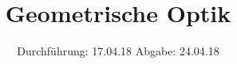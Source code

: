 

\subject{V408}
\title{Geometrische Optik}
\date{
  Durchführung: 17.04.18
  \hspace{3em}
  Abgabe: 24.04.18
}



\maketitle
\thispagestyle{empty}
\tableofcontents
\newpage








\newpage
\printbibliography


